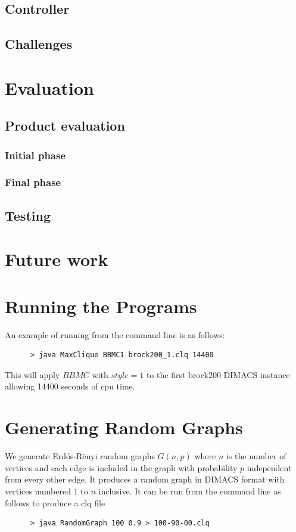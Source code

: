 \documentclass{l4proj}
\begin{document}
\section{Controller}

\section{Challenges}

\chapter{Evaluation}

\section{Product evaluation}

\subsection{Initial phase}

\subsection{Final phase}

\section{Testing}

\chapter{Future work}

\begin{appendices}

\chapter{Running the Programs}
An example of running from the command line is as follows:
\begin{verbatim}
      > java MaxClique BBMC1 brock200_1.clq 14400
\end{verbatim}
This will apply $BBMC$ with $style = 1$ to the first brock200 DIMACS instance allowing 14400 seconds of cpu time.

\chapter{Generating Random Graphs}
\label{sec:randomGraph}
We generate Erd\'{o}s-R\"{e}nyi random graphs $G(n,p)$ where $n$ is the number of vertices and
each edge is included in the graph with probability $p$ independent from every other edge. It produces
a random graph in DIMACS format with vertices numbered 1 to $n$ inclusive. It can be run from the command line as follows to produce 
a clq file
\begin{verbatim}
      > java RandomGraph 100 0.9 > 100-90-00.clq
\end{verbatim}
\end{appendices}




\end{document}

